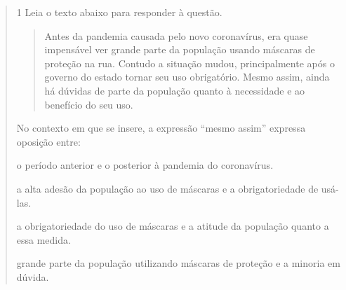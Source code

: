 \begin{quote}




%
%




\num{1} Leia o texto abaixo para responder à questão.

\begin{quote}

Antes da pandemia causada pelo novo coronavírus, era quase impensável
ver grande parte da população usando máscaras de proteção na rua.
Contudo a situação mudou, principalmente após o governo do estado tornar
seu uso obrigatório. Mesmo assim, ainda há dúvidas de parte da população
quanto à necessidade e ao benefício do seu uso.

\end{quote}


No contexto em que se insere, a expressão ``mesmo assim'' expressa oposição entre:


\begin{escolha}

  \item o período anterior e o posterior à pandemia do coronavírus.

  \item a alta adesão da população ao uso de máscaras e a obrigatoriedade de usá-las.

  \item a obrigatoriedade do uso de máscaras e a atitude da população quanto a essa medida.

  \item grande parte da população utilizando máscaras de proteção e a minoria em dúvida.


\end{escolha}
\end{quote}
